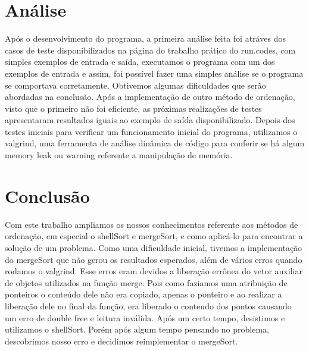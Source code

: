 \documentclass{article}
\begin{document}
\section{Análise}

Após o desenvolvimento do programa, a primeira análise feita 
foi atráves dos casos de teste disponibilizados na página do 
trabalho prático do run.codes, com simples exemplos de entrada
e saída, executamos o programa com um dos exemplos de entrada
e assim, foi possível fazer uma simples análise se o programa
se comportava corretamente. Obtivemos algumas dificuldades
que serão abordadas na conclusão. Após a implementação
de outro método de ordenação, visto que o primeiro não
foi eficiente, as próximas realizações de testes apresentaram 
resultados iguais ao exemplo de saída disponibilizado.
Depois dos testes iniciais para verificar um funcionamento 
inicial do programa, utilizamos o valgrind, uma ferramenta 
de análise dinâmica de código para conferir se há algum memory 
leak ou warning referente a manipulação de memória.


\section{Conclusão}

Com este trabalho ampliamos os nossos conhecimentos referente 
aos métodos de ordenação, em especial o shellSort e mergeSort, e como aplicá-lo
para encontrar a solução de um problema. 
Como uma dificuldade inicial, tivemos a implementação do mergeSort 
que não gerou os resultados esperados, além de vários erros quando 
rodamos o valgrind. Esse erros eram devidos a liberação errônea do vetor auxiliar
de objetos utilizados na função merge. Pois como faziamos uma atribuição de ponteiros
o conteúdo dele não era copiado, apenas o ponteiro e ao realizar a liberação dele
no final da função, era liberado o conteudo dos pontos causando um erro de double free e leitura inválida.
Após um certo tempo, desistimos e utilizamos o shellSort. Porém após algum
tempo pensando no problema, descobrimos nosso erro e decidimos reimplementar o mergeSort.
\end{document}
